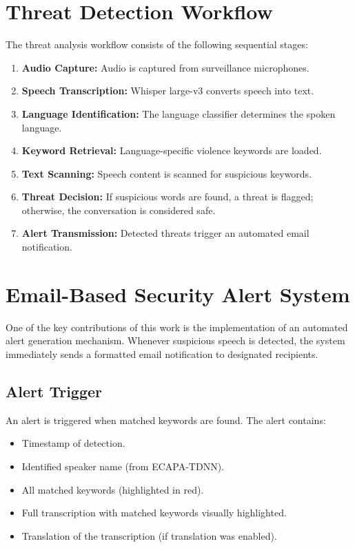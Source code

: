 \documentclass[12pt]{report}
\begin{document}
\section{Threat Detection Workflow}

The threat analysis workflow consists of the following sequential stages:
\begin{enumerate}
    \item \textbf{Audio Capture:} Audio is captured from surveillance microphones.
    \item \textbf{Speech Transcription:} Whisper large-v3 converts speech into text.
    \item \textbf{Language Identification:} The language classifier determines the spoken language.
    \item \textbf{Keyword Retrieval:} Language-specific violence keywords are loaded.
    \item \textbf{Text Scanning:} Speech content is scanned for suspicious keywords.
    \item \textbf{Threat Decision:} If suspicious words are found, a threat is flagged; otherwise, the conversation is considered safe.
    \item \textbf{Alert Transmission:} Detected threats trigger an automated email notification.
\end{enumerate}

\section{Email-Based Security Alert System}

One of the key contributions of this work is the implementation of an automated alert generation mechanism. Whenever suspicious speech is detected, the system immediately sends a formatted email notification to designated recipients.

\subsection{Alert Trigger}
An alert is triggered when matched keywords are found. The alert contains:
\begin{itemize}
    \item Timestamp of detection.
    \item Identified speaker name (from ECAPA-TDNN).
    \item All matched keywords (highlighted in red).
    \item Full transcription with matched keywords visually highlighted.
    \item Translation of the transcription (if translation was enabled).
\end{itemize}
\end{document}
